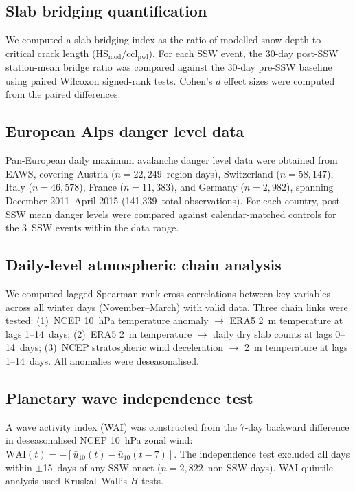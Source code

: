 \documentclass[11pt,letterpaper]{article}
\begin{document}
\subsection{Slab bridging quantification}

We computed a slab bridging index as the ratio of modelled snow depth to critical crack length ($\mathrm{HS_{mod}} / \mathrm{ccl_{pwl}}$). For each SSW event, the 30-day post-SSW station-mean bridge ratio was compared against the 30-day pre-SSW baseline using paired Wilcoxon signed-rank tests. Cohen's $d$ effect sizes were computed from the paired differences.

\subsection{European Alps danger level data}

Pan-European daily maximum avalanche danger level data were obtained from EAWS, covering Austria ($n = 22{,}249$~region-days), Switzerland ($n = 58{,}147$), Italy ($n = 46{,}578$), France ($n = 11{,}383$), and Germany ($n = 2{,}982$), spanning December 2011--April 2015 (141{,}339~total observations). For each country, post-SSW mean danger levels were compared against calendar-matched controls for the 3~SSW events within the data range.

\subsection{Daily-level atmospheric chain analysis}

We computed lagged Spearman rank cross-correlations between key variables across all winter days (November--March) with valid data. Three chain links were tested: (1)~NCEP 10~hPa temperature anomaly $\to$ ERA5 2~m temperature at lags 1--14~days; (2)~ERA5 2~m temperature $\to$ daily dry slab counts at lags 0--14~days; (3)~NCEP stratospheric wind deceleration $\to$ 2~m temperature at lags 1--14~days. All anomalies were deseasonalised.

\subsection{Planetary wave independence test}

A wave activity index (WAI) was constructed from the 7-day backward difference in deseasonalised NCEP 10~hPa zonal wind: $\mathrm{WAI}(t) = -[\bar{u}_{10}(t) - \bar{u}_{10}(t{-}7)]$. The independence test excluded all days within $\pm$15~days of any SSW onset ($n = 2{,}822$~non-SSW days). WAI quintile analysis used Kruskal--Wallis $H$ tests.
\end{document}

